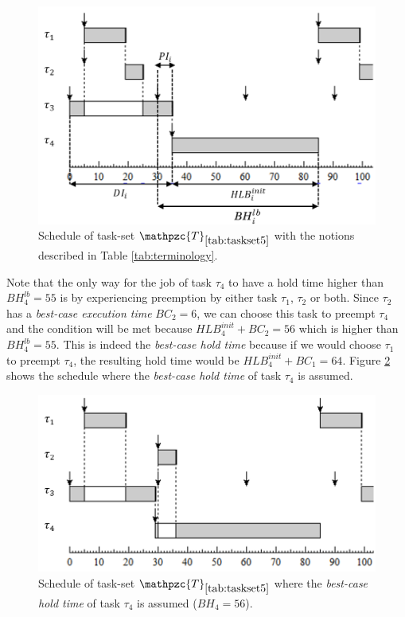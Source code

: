 \documentclass[fleqn]{article}
\begin{document}
\begin{figure}[H]
	\centering
	\includegraphics[width=0.7\linewidth]{figures/bcht_1}
	\caption{Schedule of task-set $\mathpzc{T}_{\ref{tab:taskset5}}$ with the notions described in Table \ref{tab:terminology}.}
	\label{fig:bcht_1}
\end{figure}

Note that the only way for the job of task $\tau_4$ to have a hold time higher than $BH^{lb}_4=55$ is by experiencing preemption by either task $\tau_1$, $\tau_2$ or both. Since $\tau_2$ has a \textit{best-case execution time} $BC_2=6$, we can choose this task to preempt $\tau_4$ and the condition will be met because $HLB^{init}_4+BC_2= 56$ which is higher than $BH^{lb}_4 = 55$. This is indeed the \textit{best-case hold time} because if we would choose $\tau_1$ to preempt $\tau_4$, the resulting hold time would be $HLB^{init}_4+BC_1= 64$. Figure \ref{fig:bcht_2} shows the schedule where the \textit{best-case hold time} of task $\tau_4$ is assumed.

\begin{figure}[H]
	\centering
	\includegraphics[width=0.7\linewidth]{figures/bcht_2}
	\caption{Schedule of task-set $\mathpzc{T}_{\ref{tab:taskset5}}$ where the \textit{best-case hold time} of task $\tau_4$ is assumed ($BH_4 = 56$).}
	\label{fig:bcht_2}
\end{figure}
\end{document}

